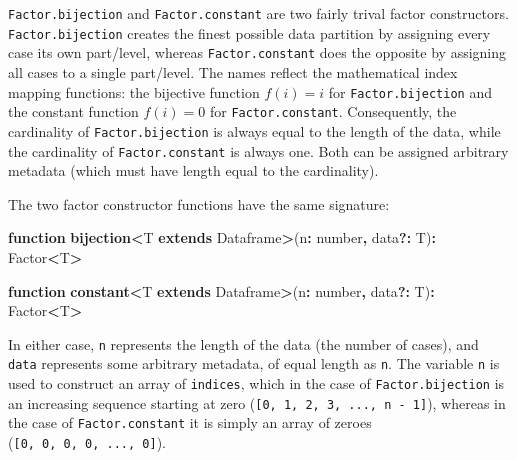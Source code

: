 \documentclass[
  openany]{book}
\newenvironment{Shaded}{\begin{snugshade}}{\end{snugshade}}
\newcommand{\DataTypeTok}[1]{\textcolor[rgb]{0.13,0.29,0.53}{#1}}
\newcommand{\FunctionTok}[1]{\textcolor[rgb]{0.13,0.29,0.53}{\textbf{#1}}}
\newcommand{\KeywordTok}[1]{\textcolor[rgb]{0.13,0.29,0.53}{\textbf{#1}}}
\newcommand{\NormalTok}[1]{#1}
\newcommand{\OperatorTok}[1]{\textcolor[rgb]{0.81,0.36,0.00}{\textbf{#1}}}
\theoremstyle{definition}
\theoremstyle{definition}
\theoremstyle{definition}
\theoremstyle{definition}
\theoremstyle{remark}
\begin{document}
\texttt{Factor.bijection} and \texttt{Factor.constant} are two fairly trival factor constructors. \texttt{Factor.bijection} creates the finest possible data partition by assigning every case its own part/level, whereas \texttt{Factor.constant} does the opposite by assigning all cases to a single part/level. The names reflect the mathematical index mapping functions: the bijective function \(f(i) = i\) for \texttt{Factor.bijection} and the constant function \(f(i) = 0\) for \texttt{Factor.constant}. Consequently, the cardinality of \texttt{Factor.bijection} is always equal to the length of the data, while the cardinality of \texttt{Factor.constant} is always one. Both can be assigned arbitrary metadata (which must have length equal to the cardinality).

The two factor constructor functions have the same signature:

\begin{Shaded}
\begin{Highlighting}[]
\KeywordTok{function} \FunctionTok{bijection}\OperatorTok{\textless{}}\NormalTok{T }\KeywordTok{extends}\NormalTok{ Dataframe}\OperatorTok{\textgreater{}}\NormalTok{(n}\OperatorTok{:} \DataTypeTok{number}\OperatorTok{,}\NormalTok{ data}\OperatorTok{?:}\NormalTok{ T)}\OperatorTok{:} 
\NormalTok{  Factor}\OperatorTok{\textless{}}\NormalTok{T}\OperatorTok{\textgreater{}}
  
\KeywordTok{function} \FunctionTok{constant}\OperatorTok{\textless{}}\NormalTok{T }\KeywordTok{extends}\NormalTok{ Dataframe}\OperatorTok{\textgreater{}}\NormalTok{(n}\OperatorTok{:} \DataTypeTok{number}\OperatorTok{,}\NormalTok{ data}\OperatorTok{?:}\NormalTok{ T)}\OperatorTok{:} 
\NormalTok{  Factor}\OperatorTok{\textless{}}\NormalTok{T}\OperatorTok{\textgreater{}} 
\end{Highlighting}
\end{Shaded}

In either case, \texttt{n} represents the length of the data (the number of cases), and \texttt{data} represents some arbitrary metadata, of equal length as \texttt{n}. The variable \texttt{n} is used to construct an array of \texttt{indices}, which in the case of \texttt{Factor.bijection} is an increasing sequence starting at zero (\texttt{{[}0,\ 1,\ 2,\ 3,\ ...,\ n\ -\ 1{]}}), whereas in the case of \texttt{Factor.constant} it is simply an array of zeroes (\texttt{{[}0,\ 0,\ 0,\ 0,\ ...,\ 0{]}}).
\end{document}
